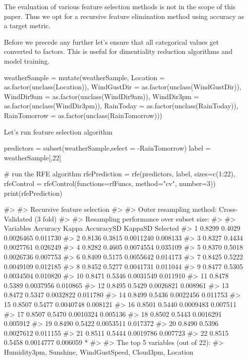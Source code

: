 The evaluation of various feature selection methods is not in the scope
of this paper. Thus we opt for a recursive feature elimination method
using accuracy as a target metric.

Before we precede any further let's ensure that all categorical values
get converted to factors. This is useful for dimentiality reduction
algorithms and model training.

\begin{Schunk}
\begin{Sinput}
weatherSample = mutate(weatherSample, Location = as.factor(unclass(Location)), 
          WindGustDir = as.factor(unclass(WindGustDir)),
          WindDir9am = as.factor(unclass(WindDir9am)), WindDir3pm = as.factor(unclass(WindDir3pm)),
          RainToday = as.factor(unclass(RainToday)), RainTomorrow = as.factor(unclass(RainTomorrow)))
\end{Sinput}
\end{Schunk}

Let's run feature selection algorithm

\begin{Schunk}
\begin{Sinput}
predictors = subset(weatherSample,select = -RainTomorrow)
label = weatherSample[,22]

# run the RFE algorithm
rfePrediction = rfe(predictors, label, sizes=c(1:22), 
                    rfeControl = rfeControl(functions=rfFuncs, method="cv", number=3))
print(rfePrediction)
\end{Sinput}
\begin{Soutput}
#> 
#> Recursive feature selection
#> 
#> Outer resampling method: Cross-Validated (3 fold) 
#> 
#> Resampling performance over subset size:
#> 
#>  Variables Accuracy  Kappa AccuracySD  KappaSD Selected
#>          1   0.8299 0.4029  0.0026465 0.011730         
#>          2   0.8136 0.3815  0.0011240 0.008133         
#>          3   0.8327 0.4434  0.0027761 0.026249         
#>          4   0.8282 0.4605  0.0074554 0.035109         
#>          5   0.8370 0.5018  0.0026736 0.007753         
#>          6   0.8409 0.5175  0.0055642 0.014173         
#>          7   0.8425 0.5222  0.0049109 0.012185         
#>          8   0.8452 0.5277  0.0041731 0.011044         
#>          9   0.8477 0.5305  0.0034504 0.010820         
#>         10   0.8471 0.5346  0.0031549 0.011910         
#>         11   0.8478 0.5389  0.0037956 0.010865         
#>         12   0.8495 0.5429  0.0026821 0.008961         
#>         13   0.8472 0.5347  0.0032822 0.011780         
#>         14   0.8499 0.5436  0.0022456 0.011753         
#>         15   0.8507 0.5477  0.0040748 0.008121         
#>         16   0.8501 0.5440  0.0009483 0.007511         
#>         17   0.8507 0.5470  0.0010324 0.005136         
#>         18   0.8502 0.5443  0.0016291 0.005912         
#>         19   0.8490 0.5422  0.0053511 0.017372         
#>         20   0.8490 0.5396  0.0027612 0.011155         
#>         21   0.8511 0.5444  0.0019786 0.007723         
#>         22   0.8515 0.5458  0.0014777 0.006059        *
#> 
#> The top 5 variables (out of 22):
#>    Humidity3pm, Sunshine, WindGustSpeed, Cloud3pm, Location
\end{Soutput}
\end{Schunk}

